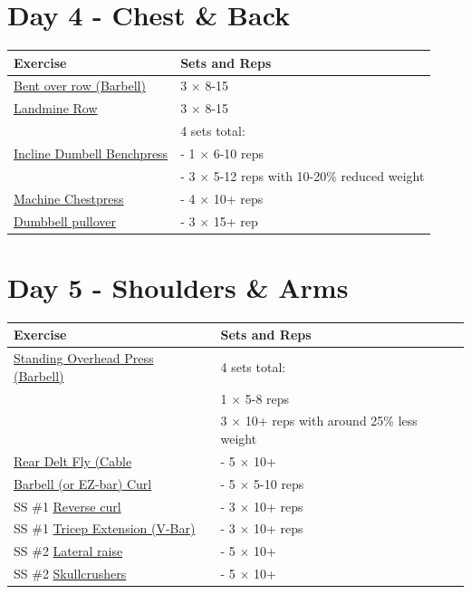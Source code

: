 \documentclass[11pt]{article}
\begin{document}
\section*{Day 4 - Chest \& Back}
\begin{center}
\begin{tabular}{|l|l|}
\hline
\textbf{Exercise} & \textbf{Sets and Reps}\\
\hline
\href{https://www.youtube.com/shorts/3OAG3sTlljk}{Bent over row (Barbell)} & 3 $\times$ 8-15 \\
\hline
\href{https://www.youtube.com/shorts/djvBoUaGDes}{Landmine Row} & 3 $\times$ 8-15 \\
\hline
& 4 sets total: \\
\href{https://www.youtube.com/watch?v=0f6-uCUKqgA}{Incline Dumbell Benchpress} & - 1  $\times$ 6-10 reps \\
& - 3  $\times$ 5-12 reps with 10-20\% reduced weight \\
\hline
\href{https://www.youtube.com/watch?v=dQw4w9WgXcQ}{Machine Chestpress} & - 4 $\times$ 10+ reps \\
\hline
\href{https://www.youtube.com/watch?v=FK4rHfWKEac}{Dumbbell pullover} & - 3 $\times$ 15+ rep\\
\hline
\end{tabular}
\end{center}

\section*{Day 5 - Shoulders \& Arms}
\begin{center}
\begin{tabular}{|l|l|}
\hline
\textbf{Exercise} & \textbf{Sets and Reps}\\
\hline
\href{https://www.youtube.com/watch?v=OSJsEPfEcU0}{Standing Overhead Press (Barbell)} & 4 sets total: \\
& 1 $\times$ 5-8 reps \\
& 3 $\times$ 10+ reps with around 25\% less weight \\
\hline
\href{https://www.youtube.com/watch?v=JENKmsEZQO8}{Rear Delt Fly (Cable} & - 5 $\times$ 10+ \\
\hline
\href{https://www.youtube.com/watch?v=bAWLx7PPK10}{Barbell (or EZ-bar) Curl} & - 5 $\times$ 5-10 reps \\
\hline
SS \#1 \href{https://www.youtube.com/shorts/zuUo-wwFQGw}{Reverse curl} & - 3 $\times$ 10+ reps \\
SS \#1 \href{https://www.youtube.com/watch?v=cGi9eO3QnOA}{Tricep Extension (V-Bar)} & - 3 $\times$ 10+ reps \\
\hline
SS \#2 \href{https://www.youtube.com/watch?v=n5dsI9qQXwY}{Lateral raise} & - 5 $\times$ 10+ \\
SS \#2 \href{https://www.youtube.com/watch?v=d_KZxkY_0cM}{Skullcrushers}  & - 5 $\times$ 10+ \\
\hline


\end{tabular}
\end{center}
\end{document}
